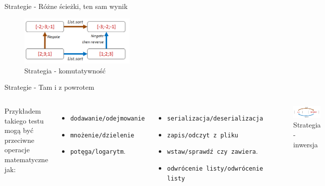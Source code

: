 \begin{frame}{Strategie - Różne ścieżki, ten sam wynik}    
    \begin{figure}
        \centering
        \includegraphics[width=0.5\textwidth]{images/property_list_sort3.png}
        \caption{Strategia - komutatywność}
        \label{fig:commutative_strategy_example_2}
    \end{figure}    
\end{frame}

\begin{frame}{Strategie - Tam i z powrotem}
    \begin{columns}[t]
            Przykładem takiego testu mogą być przeciwne operacje matematyczne jak:
            \begin{itemize}[<+->]
                \item \texttt{dodawanie/odejmowanie}
                \item \texttt{mnożenie/dzielenie}
                \item \texttt{potęga/logarytm}.
            \end{itemize} 
            \begin{itemize}[<+->]
                \item \texttt{serializacja/deserializacja}
                \item \texttt{zapis/odczyt z pliku}
                \item \texttt{wstaw/sprawdź czy zawiera}.
                \item \texttt{odwrócenie listy/odwrócenie listy}
            \end{itemize} 
        \centering
        \begin{figure}
            \centering
            \includegraphics[width=1\textwidth]{images/property_inverse.png}
            \caption{Strategia - inwersja}
            \label{fig:inverse_strategy}
        \end{figure}    
    \end{columns}
\end{frame}


